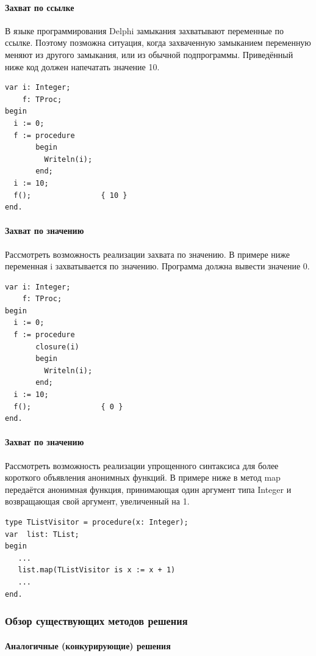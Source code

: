 \documentclass{imcs}
\begin{document}
\paragraph{Захват по ссылке}
В языке программирования Delphi замыкания захватывают переменные по ссылке. Поэтому
позможна ситуация, когда захваченную замыканием переменную меняют из другого замыкания,
или из обычной подпрограммы. Приведённый ниже код должен напечатать значение 10.
\begin{lstlisting}
var i: Integer;
    f: TProc;
begin
  i := 0;
  f := procedure
       begin
         Writeln(i);
       end;
  i := 10;
  f();                { 10 }
end.
\end{lstlisting}

\paragraph{Захват по значению}
Рассмотреть возможность реализации захвата по значению. В примере ниже переменная
i захватывается по значению. Программа должна вывести значение 0.
\begin{lstlisting}
var i: Integer;
    f: TProc;
begin
  i := 0;
  f := procedure
       closure(i)
       begin
         Writeln(i);
       end;
  i := 10;
  f();                { 0 }
end.
\end{lstlisting}

\paragraph{Захват по значению}
Рассмотреть возможность реализации упрощенного синтаксиса для более короткого объявления
анонимных функций. В примере ниже в метод map передаётся анонимная функция, принимающая
один аргумент типа Integer и возвращающая свой аргумент, увеличенный на 1.
\begin{lstlisting}
type TListVisitor = procedure(x: Integer);
var  list: TList;
begin
   ...
   list.map(TListVisitor is x := x + 1)
   ...
end.
\end{lstlisting}

\subsubsection{Обзор существующих методов решения}

\paragraph{Аналогичные (конкурирующие) решения}
\end{document}
